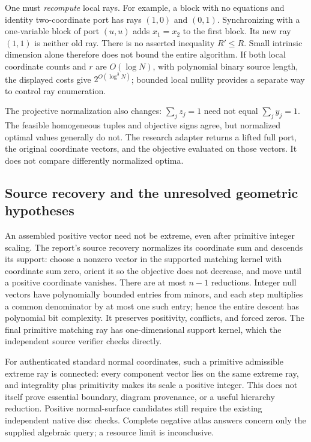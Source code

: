 One must \emph{recompute} local rays.  For example, a block with no
equations and identity two-coordinate port has rays $(1,0)$ and
$(0,1)$.  Synchronizing with a one-variable block of port $(u,u)$ adds
$x_1=x_2$ to the first block.  Its new ray $(1,1)$ is neither old ray.
There is no asserted inequality $R'\leq R$.  Small intrinsic dimension
alone therefore does not bound the entire algorithm.  If both local
coordinate counts and $r$ are $O(\log N)$, with polynomial binary
source length, the displayed costs give $2^{O(\log^3N)}$; bounded local
nullity provides a separate way to control ray enumeration.

The projective normalization also changes: $\sum_j z_j=1$ need not
equal $\sum_j y_j=1$.  The feasible homogeneous tuples and objective
signs agree, but normalized optimal values generally do not.  The
research adapter returns a lifted full port, the original coordinate
vectors, and the objective evaluated on those vectors.  It does not
compare differently normalized optima.

\subsection{Source recovery and the unresolved geometric hypotheses}

An assembled positive vector need not be extreme, even after primitive
integer scaling.  The report's source recovery normalizes its coordinate
sum and descends its support: choose a nonzero vector in the supported
matching kernel with coordinate sum zero, orient it so the objective
does not decrease, and move until a positive coordinate vanishes.
There are at most $n-1$ reductions.  Integer null vectors have
polynomially bounded entries from minors, and each step multiplies a
common denominator by at most one such entry; hence the entire descent
has polynomial bit complexity.  It preserves positivity, conflicts,
and forced zeros.  The final primitive matching ray has one-dimensional
support kernel, which the independent source verifier checks directly.

For authenticated standard normal coordinates, such a primitive
admissible extreme ray is connected: every component vector lies on
the same extreme ray, and integrality plus primitivity makes its scale
a positive integer.  This does not itself prove essential boundary,
diagram provenance, or a useful hierarchy reduction.  Positive
normal-surface candidates still require the existing independent native
disc checks.  Complete negative atlas answers concern only the supplied
algebraic query; a resource limit is inconclusive.

